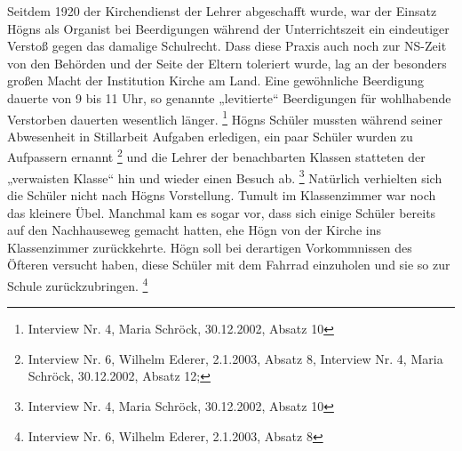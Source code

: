 \documentclass[a4paper]{article}
\begin{document}
Seitdem 1920 der Kirchendienst der Lehrer abgeschafft wurde, war der
Einsatz Högns als Organist bei Beerdigungen während der Unterrichtszeit
ein eindeutiger Verstoß gegen das damalige Schulrecht. Dass diese
Praxis auch noch zur NS-Zeit von den Behörden und der Seite der Eltern
toleriert wurde, lag an der besonders großen Macht der Institution
Kirche am Land. Eine gewöhnliche Beerdigung dauerte von 9 bis 11 Uhr,
so genannte „levitierte“ Beerdigungen für wohlhabende Verstorben
dauerten wesentlich länger. \footnote{Interview Nr. 4, Maria Schröck,
30.12.2002, Absatz 10} Högns Schüler mussten während seiner Abwesenheit
in Stillarbeit Aufgaben erledigen, ein paar Schüler wurden zu
Aufpassern ernannt \footnote{Interview Nr. 6, Wilhelm Ederer, 2.1.2003,
Absatz 8, Interview Nr. 4, Maria Schröck, 30.12.2002, Absatz 12;} und
die Lehrer der benachbarten Klassen statteten der „verwaisten Klasse“
hin und wieder einen Besuch ab. \footnote{Interview Nr. 4, Maria
Schröck, 30.12.2002, Absatz 10} Natürlich verhielten sich die Schüler
nicht nach Högns Vorstellung. Tumult im Klassenzimmer war noch das
kleinere Übel. Manchmal kam es sogar vor, dass sich einige Schüler
bereits auf den Nachhauseweg gemacht hatten, ehe Högn von der Kirche
ins Klassenzimmer zurückkehrte. Högn soll bei derartigen Vorkommnissen
des Öfteren versucht haben, diese Schüler mit dem Fahrrad einzuholen
und sie so zur Schule zurückzubringen. \footnote{Interview Nr. 6,
Wilhelm Ederer, 2.1.2003, Absatz 8}
\end{document}
